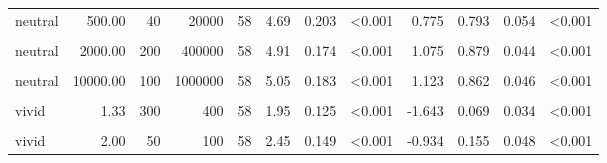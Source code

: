 \documentclass[
]{article}
\begin{document}
\begin{longtable}[t]{lrrrrrrlrrrl}
\hspace{1em}neutral & 500.00 & 40 & 20000 & 58 & 4.69 & 0.203 & <0.001 & 0.775 & 0.793 & 0.054 & <0.001\\
\hspace{1em}\cellcolor{gray!10}{neutral} & \cellcolor{gray!10}{2000.00} & \cellcolor{gray!10}{20} & \cellcolor{gray!10}{40000} & \cellcolor{gray!10}{58} & \cellcolor{gray!10}{5.10} & \cellcolor{gray!10}{0.170} & \cellcolor{gray!10}{<0.001} & \cellcolor{gray!10}{1.253} & \cellcolor{gray!10}{0.862} & \cellcolor{gray!10}{0.046} & \cellcolor{gray!10}{<0.001}\\
\hspace{1em}neutral & 2000.00 & 200 & 400000 & 58 & 4.91 & 0.174 & <0.001 & 1.075 & 0.879 & 0.044 & <0.001\\
\hspace{1em}\cellcolor{gray!10}{neutral} & \cellcolor{gray!10}{10000.00} & \cellcolor{gray!10}{30} & \cellcolor{gray!10}{300000} & \cellcolor{gray!10}{58} & \cellcolor{gray!10}{5.00} & \cellcolor{gray!10}{0.166} & \cellcolor{gray!10}{<0.001} & \cellcolor{gray!10}{1.194} & \cellcolor{gray!10}{0.879} & \cellcolor{gray!10}{0.044} & \cellcolor{gray!10}{<0.001}\\
\hspace{1em}neutral & 10000.00 & 100 & 1000000 & 58 & 5.05 & 0.183 & <0.001 & 1.123 & 0.862 & 0.046 & <0.001\\
\hspace{1em}\cellcolor{gray!10}{vivid} & \cellcolor{gray!10}{1.33} & \cellcolor{gray!10}{30} & \cellcolor{gray!10}{40} & \cellcolor{gray!10}{58} & \cellcolor{gray!10}{2.05} & \cellcolor{gray!10}{0.163} & \cellcolor{gray!10}{<0.001} & \cellcolor{gray!10}{-1.173} & \cellcolor{gray!10}{0.069} & \cellcolor{gray!10}{0.034} & \cellcolor{gray!10}{<0.001}\\
\hspace{1em}vivid & 1.33 & 300 & 400 & 58 & 1.95 & 0.125 & <0.001 & -1.643 & 0.069 & 0.034 & <0.001\\
\hspace{1em}\cellcolor{gray!10}{vivid} & \cellcolor{gray!10}{2.00} & \cellcolor{gray!10}{20} & \cellcolor{gray!10}{40} & \cellcolor{gray!10}{58} & \cellcolor{gray!10}{2.26} & \cellcolor{gray!10}{0.142} & \cellcolor{gray!10}{<0.001} & \cellcolor{gray!10}{-1.161} & \cellcolor{gray!10}{0.121} & \cellcolor{gray!10}{0.044} & \cellcolor{gray!10}{<0.001}\\
\hspace{1em}vivid & 2.00 & 50 & 100 & 58 & 2.45 & 0.149 & <0.001 & -0.934 & 0.155 & 0.048 & <0.001\\

\end{longtable}
\end{document}
